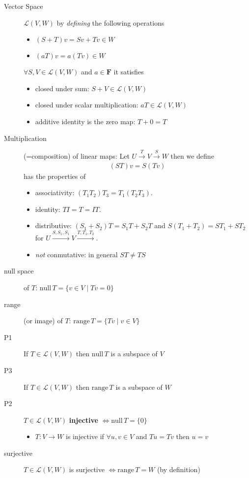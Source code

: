 \documentclass[11pt,notitlepage,oneside]{article}
\newcommand{\nullspace}[1]{\mathrm{null}\,{#1}}
\newcommand{\rangespace}[1]{\mathrm{range}\,{#1}}
\begin{document}
\begin{description}
  \item[Vector Space] $\mathcal{L}(V,W)$  by \emph{defining} the following operations
  \begin{itemize}
  \item $(S+T)v = Sv + Tv \in W$ 
  \item $(aT)v = a(Tv) \in W$
  \end{itemize}
  $\forall S,V \in \mathcal{L}(V,W)$ and $a\in\mathbf{F}$ it satisfies
  \begin{itemize}
  \item closed under sum: $S+V \in \mathcal{L}(V,W)$
  \item closed under scalar multiplication: $aT \in \mathcal{L}(V,W)$
  \item additive identity is the zero map: $T+0=T$
  \end{itemize}
  \item[Multiplication] (=composition) of linear maps: Let $U \xrightarrow{T} V \xrightarrow{S} W$ then we define
  \begin{align*}
  (ST)v = S(Tv)
  \end{align*}
  has the properties of
  \begin{itemize}
  \item associativity: $(T_1T_2)T_3 = T_1(T_2T_3)$.
  \item identity: $TI = T = IT$.
  \item distributive: $(S_1+S_2)T = S_1T+S_2T$ and $S(T_1+T_2) = ST_1 +ST_2$ for $U\xrightarrow{S,S_1,S_1} V \xrightarrow{T,T_1,T_2}$.
  \item \emph{not} conmutative: in general $ST \neq TS $
  \end{itemize}
  \item[null space\label{itm:D3_nullspace}] of $T$: $\nullspace{T} = \{v\in V \mid Tv=0\}$
  \item[range] (or image) of $T$: $\rangespace{T} = \{Tv \mid v\in V\}$
  \item[P1]If $T\in\mathcal{L}(V,W)$ then $\nullspace{T}$ is a subspace of $V$
  \item[P3]If $T\in\mathcal{L}(V,W)$ then $\rangespace{T}$ is a subspace of $W$
  \item[P2\label{itm:T3_2}]$T\in\mathcal{L}(V,W)$ \textbf{injective} $\iff \nullspace{T}=\{0\}$
  \begin{itemize}
  \item $T:V\to W$ is injective if $\forall u,v \in V$ and $Tu=Tv$ then $u=v$
  \end{itemize}
  \item[surjective] $T\in\mathcal{L}(V,W)$ is surjective $\iff  \rangespace{T} = W$ (by definition)

\end{description}
\end{document}
